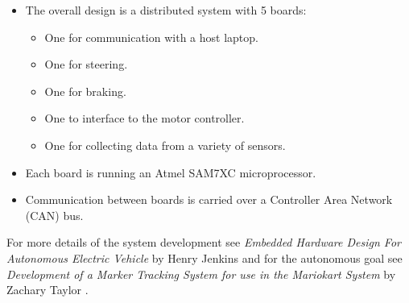     \renewcommand{\labelitemi}{$\bullet$}
    \renewcommand{\labelitemii}{$\circ$}
    \begin{itemize}
      \item The overall design is a distributed system with 5 boards:
            \begin{itemize}
              \item One for communication with a host laptop.
              \item One for steering.
              \item One for braking.
              \item One to interface to the motor controller.
              \item One for collecting data from a variety of sensors.
            \end{itemize}

      \item Each board is running an Atmel SAM7XC microprocessor.

      \item Communication between boards is carried over a Controller Area
            Network (CAN) bus.

    \end{itemize}

    For more details of the system development see \emph{Embedded Hardware
    Design For Autonomous Electric Vehicle} by Henry Jenkins \cite{jenkins_2011}
    and for the autonomous goal see \emph{Development of a Marker Tracking
    System for use in the Mariokart System} by Zachary Taylor \cite{Taylor_2011}.
